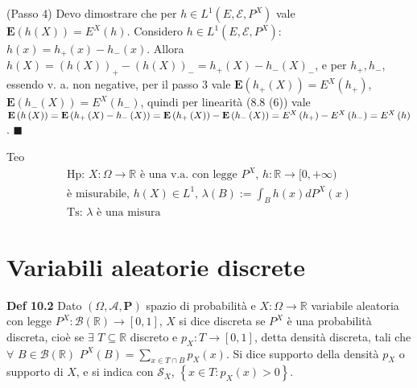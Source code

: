 \documentclass{article}
\begin{document}
(Passo 4) Devo dimostrare che per $h\in L^{1}\left( E,\mathcal{E}%
,P^{X}\right) $ vale $\mathbf{E}\left( h\left( X\right) \right) =E^{X}\left(
h\right) $. Considero $h\in L^{1}\left( E,\mathcal{E},P^{X}\right) $: $%
h\left( x\right) =h_{+}\left( x\right) -h_{-}\left( x\right) $. Allora $%
h\left( X\right) =\left( h\left( X\right) \right) _{+}-\left( h\left(
X\right) \right) _{-}=h_{+}\left( X\right) -h_{-}\left( X\right) _{-}$, e
per $h_{+},h_{-}$, essendo v. a. non negative, per il passo 3 vale $\mathbf{E%
}\left( h_{+}\left( X\right) \right) =E^{X}\left( h_{+}\right) $, $\mathbf{E}%
\left( h_{-}\left( X\right) \right) =E^{X}\left( h_{-}\right) $, quindi per
linearit\`{a} (8.8 (6)) vale $\mathbf{E}\left( h\left( X\right) \right) =%
\mathbf{E}\left( h_{+}\left( X\right) -h_{-}\left( X\right) \right) =\mathbf{%
E}\left( h_{+}\left( X\right) \right) -\mathbf{E}\left( h_{-}\left( X\right)
\right) =E^{X}\left( h_{+}\right) -E^{X}\left( h_{-}\right) =E^{X}\left(
h\right) $. $\blacksquare $

Teo%
\begin{gather*}
\text{Hp: }X:\Omega \rightarrow 
\mathbb{R}
\text{ \`{e} una v.a. con legge }P^{X}\text{, }h:%
\mathbb{R}
\rightarrow \lbrack 0,+\infty )\text{ } \\
\text{\`{e} misurabile, }h\left( X\right) \in L^{1}\text{, }\lambda \left(
B\right) :=\int_{B}h\left( x\right) dP^{X}\left( x\right) \\
\text{Ts: }\lambda \text{ \`{e} una misura}
\end{gather*}

\section{Variabili aleatorie discrete}

\textbf{Def 10.2} Dato $\left( \Omega ,\mathcal{A},\mathbf{P}\right) $
spazio di probabilit\`{a} e $X:\Omega \rightarrow 
\mathbb{R}
$ variabile aleatoria con legge $P^{X}:\mathcal{B}\left( 
\mathbb{R}
\right) \rightarrow \left[ 0,1\right] $, $X$ si dice discreta se $P^{X}$ 
\`{e} una probabilit\`{a} discreta, cio\`{e} se $\exists $ $T\subseteq 
\mathbb{R}
$ discreto e $p_{X}:T\rightarrow \left[ 0,1\right] $, detta densit\`{a}
discreta, tali che $\forall $ $B\in \mathcal{B}\left( 
\mathbb{R}
\right) $ $P^{X}\left( B\right) =\sum_{x\in T\cap B}p_{X}\left( x\right) $.
Si dice supporto della densit\`{a} $p_{X}$ o supporto di $X$, e si indica
con $\mathcal{S}_{X}$, $\left\{ x\in T:p_{X}\left( x\right) >0\right\} $.
\end{document}
